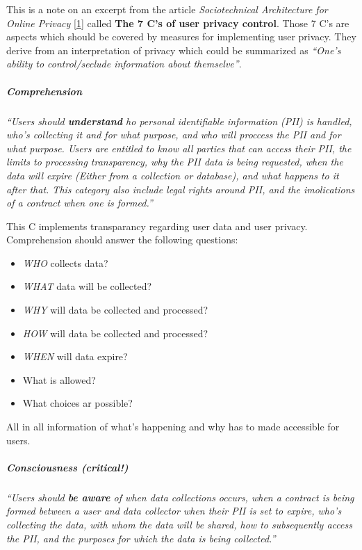 This is a note on an excerpt from the article \emph{Sociotechnical
Architecture for Online Privacy} {[}\hyperref[references]{1}{]} called
\textbf{The 7 C's of user privacy control}. Those 7 C's are aspects
which should be covered by measures for implementing user privacy. They
derive from an interpretation of privacy which could be summarized as
\emph{``One's ability to control/seclude information about themselve''}.



\subparagraph{Comprehension}

\emph{``Users should \textbf{understand} ho personal identifiable
information (PII) is handled, who's collecting it and for what purpose,
and who will proccess the PII and for what purpose. Users are entitled
to know all parties that can access their PII, the limits to processing
transparency, why the PII data is being requested, when the data will
expire (Either from a collection or database), and what happens to it
after that. This category also include legal rights around PII, and the
imolications of a contract when one is formed.''}

This C implements transparancy regarding user data and user privacy.
Comprehension should answer the following questions:

\begin{itemize}

\item
  \emph{WHO} collects data?
\item
  \emph{WHAT} data will be collected?
\item
  \emph{WHY} will data be collected and processed?
\item
  \emph{HOW} will data be collected and processed?
\item
  \emph{WHEN} will data expire?
\item
  What is allowed?
\item
  What choices ar possible?
\end{itemize}

All in all information of what's happening and why has to made
accessible for users.

\subparagraph{Consciousness \textbf{(critical!)}}

\emph{``Users should \textbf{be aware} of when data collections occurs,
when a contract is being formed between a user and data collector when
their PII is set to expire, who's collecting the data, with whom the
data will be shared, how to subsequently access the PII, and the
purposes for which the data is being collected.''}

